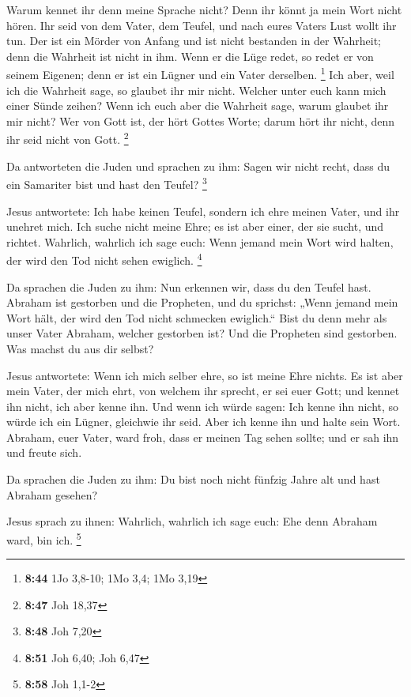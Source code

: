  Warum kennet ihr denn meine Sprache nicht? Denn ihr
könnt ja mein Wort nicht hören.  Ihr seid von dem Vater,
dem Teufel, und nach eures Vaters Lust wollt ihr tun. Der ist ein Mörder
von Anfang und ist nicht bestanden in der Wahrheit; denn die Wahrheit
ist nicht in ihm. Wenn er die Lüge redet, so redet er von seinem
Eigenen; denn er ist ein Lügner und ein Vater derselben. \footnote{\textbf{8:44}
  1Jo 3,8-10; 1Mo 3,4; 1Mo 3,19}  Ich aber, weil ich die
Wahrheit sage, so glaubet ihr mir nicht.  Welcher unter
euch kann mich einer Sünde zeihen? Wenn ich euch aber die Wahrheit sage,
warum glaubet ihr mir nicht?  Wer von Gott ist, der hört
Gottes Worte; darum hört ihr nicht, denn ihr seid nicht von Gott.
\footnote{\textbf{8:47} Joh 18,37}

 Da antworteten die Juden und sprachen zu ihm: Sagen wir
nicht recht, dass du ein Samariter bist und hast den Teufel? \footnote{\textbf{8:48}
  Joh 7,20}

 Jesus antwortete: Ich habe keinen Teufel, sondern ich
ehre meinen Vater, und ihr unehret mich.  Ich suche nicht
meine Ehre; es ist aber einer, der sie sucht, und richtet.
 Wahrlich, wahrlich ich sage euch: Wenn jemand mein Wort
wird halten, der wird den Tod nicht sehen ewiglich. \footnote{\textbf{8:51}
  Joh 6,40; Joh 6,47}

 Da sprachen die Juden zu ihm: Nun erkennen wir, dass du
den Teufel hast. Abraham ist gestorben und die Propheten, und du
sprichst: „Wenn jemand mein Wort hält, der wird den Tod nicht schmecken
ewiglich.``  Bist du denn mehr als unser Vater Abraham,
welcher gestorben ist? Und die Propheten sind gestorben. Was machst du
aus dir selbst?

 Jesus antwortete: Wenn ich mich selber ehre, so ist
meine Ehre nichts. Es ist aber mein Vater, der mich ehrt, von welchem
ihr sprecht, er sei euer Gott;  und kennet ihn nicht, ich
aber kenne ihn. Und wenn ich würde sagen: Ich kenne ihn nicht, so würde
ich ein Lügner, gleichwie ihr seid. Aber ich kenne ihn und halte sein
Wort.  Abraham, euer Vater, ward froh, dass er meinen Tag
sehen sollte; und er sah ihn und freute sich.

 Da sprachen die Juden zu ihm: Du bist noch nicht fünfzig
Jahre alt und hast Abraham gesehen?

 Jesus sprach zu ihnen: Wahrlich, wahrlich ich sage euch:
Ehe denn Abraham ward, bin ich. \footnote{\textbf{8:58} Joh 1,1-2}

